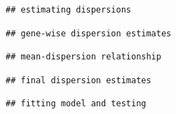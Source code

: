 \documentclass[
]{book}
\begin{document}
\begin{verbatim}
## estimating dispersions
\end{verbatim}

\begin{verbatim}
## gene-wise dispersion estimates
\end{verbatim}

\begin{verbatim}
## mean-dispersion relationship
\end{verbatim}

\begin{verbatim}
## final dispersion estimates
\end{verbatim}

\begin{verbatim}
## fitting model and testing
\end{verbatim}
\end{document}

